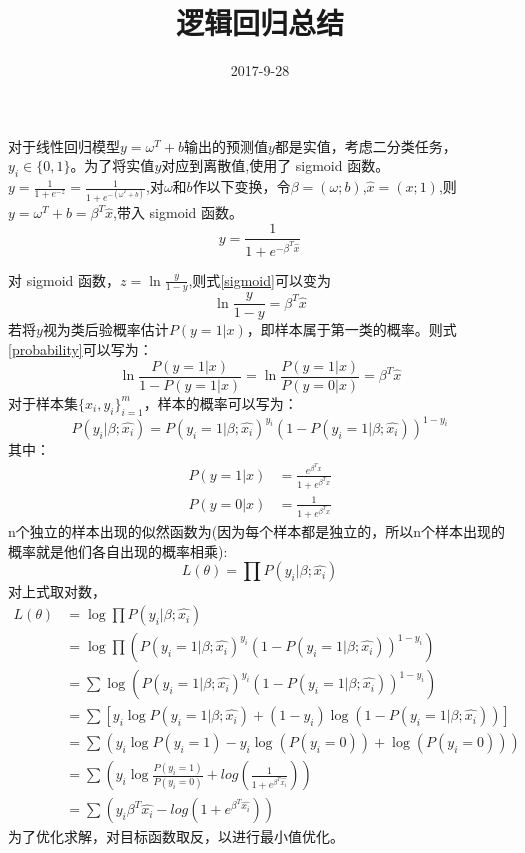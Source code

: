 \documentclass[a4paper]{article}
\begin{document}
    \title{逻辑回归总结}
    \date{2017-9-28}
    \maketitle

    对于线性回归模型$y=\omega^T+b$输出的预测值$y$都是实值，考虑二分类任务，$y_i\in\{0,1\}$。为了将实值$y$对应到离散值,使用了 sigmoid 函数。$y=\frac{1}{1+e^{-z}}=\frac{1}{1+e^{-(\omega^T+b)}}$,对$\omega$和$b$作以下变换，令$\beta=(\omega;b)$,$\hat{x}=(x;1)$,则$y=\omega^T+b=\beta^T\hat{x}$,带入 sigmoid 函数。
	\begin{equation}\label{sigmoid}
		y=\frac{1}{1+e^{-\beta^T\hat{x}}}
	\end{equation}

	对 sigmoid 函数，$z=\ln\frac{y}{1-y}$,则式\eqref{sigmoid}可以变为
	\begin{equation}\label{probability}
		\ln\frac{y}{1-y}=\beta^T\hat{x}
	\end{equation}
	若将$y$视为类后验概率估计$P(y=1|x)$，即样本属于第一类的概率。则式\eqref{probability}可以写为：
	\begin{equation*}
		\ln\frac{P(y=1|x)}{1-P(y=1|x)}=\ln\frac{P(y=1|x)}{P(y=0|x)}=\beta^T\hat{x}
	\end{equation*}
	对于样本集$\{x_i,y_i\}^{m}_{i=1}$，样本的概率可以写为：
	\begin{equation*}
		P(y_i|\beta;\hat{x_i})=P(y_i=1|\beta;\hat{x_i})^{y_i}\left(1-P(y_i=1|\beta;\hat{x_i})\right)^{1-y_i}
	\end{equation*}
	其中：
	\begin{align}
		P(y=1|x)&=\frac{e^{\beta^Tx}}{1+e^{\beta^Tx}}\\
		P(y=0|x)&=\frac{1}{1+e^{\beta^Tx}}
	\end{align}
	n个独立的样本出现的似然函数为(因为每个样本都是独立的，所以n个样本出现的概率就是他们各自出现的概率相乘):
	\begin{equation}
	L(\theta)=\prod	P(y_i|\beta;\hat{x_i})
	\end{equation}
	对上式取对数，
	\begin{equation}\label{siran}
		\begin{split}
		L(\theta)&=\log\prod	P(y_i|\beta;\hat{x_i})\\
		&=\log \prod \left(P(y_i=1|\beta;\hat{x_i})^{y_i}\left(1-P(y_i=1|\beta;\hat{x_i})\right)^{1-y_i} \right)\\
		&=\sum\log \left(P(y_i=1|\beta;\hat{x_i})^{y_i}\left(1-P(y_i=1|\beta;\hat{x_i})\right)^{1-y_i} \right)\\
		&=\sum \left[ y_i\log P(y_i=1|\beta;\hat{x_i}) + (1-y_i)\log(1-P(y_i=1|\beta;\hat{x_i}))\right]\\
		&=\sum \left( y_i \log P(y_i=1) - y_i \log(P(y_i=0))+\log(P(y_i=0))\right)\\
		&=\sum \left( y_i \log \frac{P(y_i=1)}{P(y_i=0)} + log(\frac{1}{1+e^{\beta^T\hat{x_i}}})\right)\\
		&=\sum \left(
		y_i\beta^T\hat{x_i}-log(1+e^{\beta^T\hat{x_i}})
		\right)
		\end{split}
	\end{equation}
	为了优化求解，对目标函数取反，以进行最小值优化。
\end{document}
